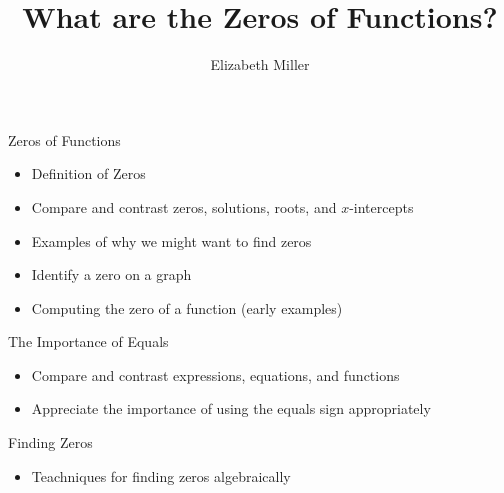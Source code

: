 \documentclass{ximera}
\author{Elizabeth Miller}
\title{What are the Zeros of Functions?}
\begin{document}
\begin{abstract}
\end{abstract}
\maketitle


\begin{objectives}

\item Zeros of Functions
\begin{itemize}
	\item Definition of Zeros 
	\item Compare and contrast zeros, solutions, roots, and $x$-intercepts 
	\item Examples of why we might want to find zeros
	\item Identify a zero on a graph
	\item Computing the zero of a function (early examples)
\end{itemize}

\item The Importance of Equals
\begin{itemize}
	\item Compare and contrast expressions, equations, and functions
	\item Appreciate the importance of using the equals sign appropriately
\end{itemize}

\item Finding Zeros
\begin{itemize}
	\item Teachniques for finding zeros algebraically
\end{itemize}


\end{objectives}
\end{document}
